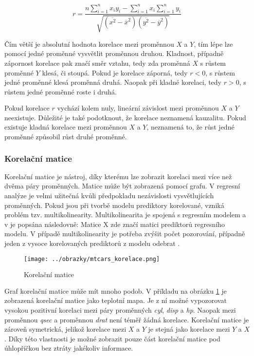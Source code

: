 \begin{equation}
r = \frac{n \sum_{i=1}^n x_i y_i - \sum_{i=1}^n x_i \sum_{i=1}^n y_i}
{\sqrt{(\overline{x^2} - \overline{x}^2)(\overline{y^2} - \overline{y}^2)}}
\end{equation}

Čím větší je absolutní hodnota korelace mezi proměnnou $X$ a $Y$, tím lépe lze pomocí jedné proměnné vysvětlit proměnnou druhou. Kladnost, případně zápornost korelace
pak značí směr vztahu, tedy zda proměnná $X$ s růstem proměnné $Y$ klesá, či stoupá. Pokud je korelace záporná, tedy $r < 0$, s růstem jedné proměnné klesá proměnná druhá.
Naopak při kladné korelaci, tedy $r > 0$, s růstem jedné proměnné roste i druhá.

Pokud korelace $r$ vychází kolem nuly, lineární závislost mezi proměnnou $X$ a $Y$ neexistuje. Důležité je také podotknout, že korelace neznamená kauzalitu. Pokud
existuje kladná korelace mezi proměnnou $X$ a $Y$, neznamená to, že růst jedné proměnné způsobil růst druhé proměnné.  


\subsubsection{Korelační matice}
Korelační matice je nástroj, díky kterému lze zobrazit korelaci mezi více než dvěma páry proměnných. Matice může být zobrazená pomocí grafu. V regresní analýze
je velmi užitečná kvůli předpokladu nezávislosti vysvětlujících proměnných. Pokud jsou při tvorbě modelu prediktory korelované,
vzniká problém tzv. multikolinearity. Multikolinearita je spojená s regresním modelem a v \cite{hebak_regrese_1998} je popsána následovně:
Matice X zde značí matici prediktorů regresního modelu. V případě multikolinearity je potřeba zvýšit počet pozorování, případně jeden z vysoce korelovaných prediktorů z modelu
odebrat \cite{kleinbaum_logistic_2010}.

\begin{figure}[H]
    \centering
    \texttt{[image: ../obrazky/mtcars\_korelace.png]}
    \caption{Korelační matice} 
    \label{fig:mtcars_korelace}
\end{figure}

Graf korelační matice může mít mnoho podob. V příkladu na obrázku \ref{fig:mtcars_korelace} je zobrazená korelační matice jako teplotní mapa. Je z ní možné vypozorovat vysokou
pozitivní korelaci mezi páry proměnných \textit{cyl}, \textit{disp} a \textit{hp}. Naopak mezi proměnnou \textit{qsec} a proměnnou \textit{drat} není téměř žádná korelace.
Korelační matice je zároveň symetrická, jelikož korelace mezi $X$ a $Y$ je stejná jako korelace mezi $Y$ a $X$. Díky této vlastnosti je možné zobrazit pouze část korelační matice
pod úhlopříčkou bez ztráty jakékoliv informace.

